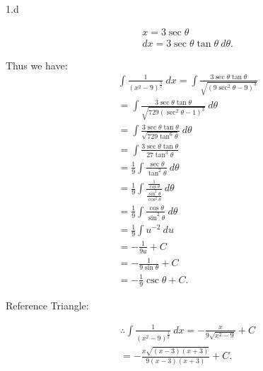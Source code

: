 \documentclass{report}
\begin{document}
    \bigbreak \noindent 
    1.d
    \bigbreak \noindent 
    \begin{minipage}[t]{0.47\textwidth}
        \begin{align*}
            &x = 3\sec{\theta} \\
            &dx = 3\sec{\theta}\tan{\theta}\ d\theta 
        .\end{align*}
    \end{minipage}
    \begin{minipage}[t]{0.47\textwidth}
        Thus we have:
        \begin{align*}
            &\int \frac{1}{(x^{2}-9)^{\frac{3}{2}}}\ dx = \int \frac{3\sec{\theta}\tan{\theta}}{\sqrt{(9\sec^{2}{\theta}-9)^{3}}} \\
            &=\int \frac{3\sec{\theta}\tan{\theta}}{\sqrt{729(\sec^{2}{\theta }-1)^{3}}}\ d\theta  \\
            &=\int \frac{3\sec{\theta }\tan{\theta }}{\sqrt{729\tan^{6}{\theta }}}\ d\theta  \\
            &=\int \frac{3\sec{\theta }\tan{\theta }}{27\tan^{3}{\theta }} \\
            &=\frac{1}{9}\int \frac{\sec{\theta }}{\tan^{2}{\theta }}\ d\theta \\
            &=\frac{1}{9}\int \frac{\frac{1}{\cos{\theta }}}{\frac{\sin^{2}{\theta }}{\cos^{2}{\theta }}}\ d\theta \\
            &=\frac{1}{9}\int \frac{\cos{\theta }}{\sin^{2}{\theta }}\ d\theta  \\
            &=\frac{1}{9}\int u^{-2}\ du \\
            &=-\frac{1}{9u} + C \\
            &=-\frac{1}{9\sin{\theta }} + C \\
            &=-\frac{1}{9}\csc{\theta } + C
        .\end{align*}
    \end{minipage}
    \bigbreak \noindent 
    \begin{minipage}[]{0.47\textwidth}
        Reference Triangle:
        \bigbreak \noindent 
    \end{minipage}
    \begin{minipage}[]{0.47\textwidth}
        \begin{align*}
            &\therefore \int \frac{1}{(x^{2}-9)^{\frac{3}{2}}}\ dx = -\frac{x}{9\sqrt{x^{2}-9}} + C\\
            &=-\frac{x\sqrt{(x-3)(x+3)}}{9(x-3)(x+3)} + C
        .\end{align*}
    \end{minipage}
\end{document}
